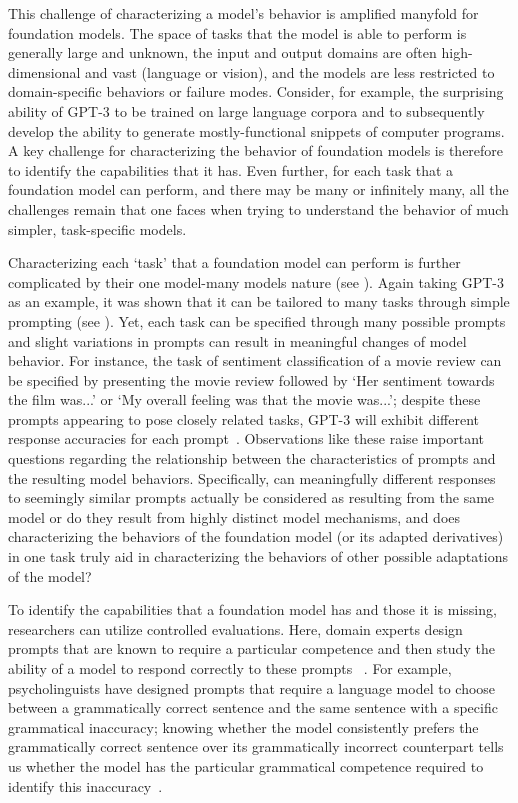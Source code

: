 This challenge of characterizing a model's behavior is amplified manyfold for foundation models.
The space of tasks that the model is able to perform is generally large and unknown, the input and output domains are often high-dimensional and vast (\eg language or vision), and the models are less restricted to domain-specific behaviors or failure modes.
Consider, for example, the surprising ability of GPT-3 to be trained on large language corpora and to subsequently develop the ability to generate mostly-functional snippets of computer programs. 
A key challenge for characterizing the behavior of foundation models is therefore to identify the capabilities that it has.
Even further, for each task that a foundation model can perform, and there may be many or infinitely many, all the challenges remain that one faces when trying to understand the behavior of much simpler, task-specific models.

Characterizing each `task' that a foundation model can perform is further complicated by their one model-many models nature (see ).
Again taking GPT-3 as an example, it was shown that it can be tailored to many tasks through simple prompting (see ).
Yet, each task can be specified through many possible prompts and slight variations in prompts can result in meaningful changes of model behavior.
For instance, the task of sentiment classification of a movie review can be specified by presenting the movie review followed by `Her sentiment towards the film was...' or `My overall feeling was that the movie was...'; despite these prompts appearing to pose closely related tasks, GPT-3 will exhibit different response accuracies for each prompt~\citep{Zhao2021calibrate}.
Observations like these raise important questions regarding the relationship between the characteristics of prompts and the resulting model behaviors.
Specifically, can meaningfully different responses to seemingly similar prompts actually be considered as resulting from the same model or do they result from highly distinct model mechanisms, and does characterizing the behaviors of the foundation model (or its adapted derivatives) in one task truly aid in characterizing the behaviors of other possible adaptations of the model?

To identify the capabilities that a foundation model has and those it is missing, researchers can utilize controlled  evaluations.
Here, domain experts design prompts that are known to require a particular competence and then study the ability of a model to respond correctly to these prompts ~\citep{papadimitriou2020learning,DBLP:journals/corr/abs-2103-05247,kataoka2020pre,wu2021identifying,xie2021innout,koh2021wilds}.
For example, psycholinguists have designed prompts that require a language model to choose between a grammatically correct sentence and the same sentence with a specific  grammatical inaccuracy; knowing whether the model consistently prefers the grammatically correct sentence over its grammatically incorrect counterpart tells us whether the model has the particular grammatical competence required to identify this inaccuracy~\citep{linzen2016assessing}.

